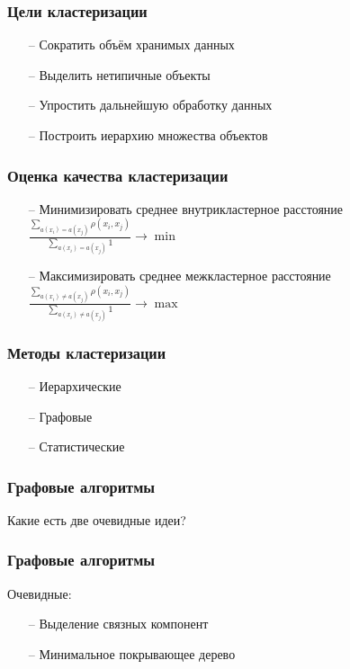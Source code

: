 \documentclass[12pt]{beamer}
\begin{document}
\begin{frame}\frametitle{Цели кластеризации}
	\begin{itemize}
		\item[--] Сократить объём хранимых данных
		\item[--] Выделить нетипичные объекты
		\item[--] Упростить дальнейшую обработку данных
		\item[--] Построить иерархию множества объектов				
	\end{itemize}
\end{frame}

\begin{frame}\frametitle{Оценка качества кластеризации}
\begin{itemize}
\item[--] Минимизировать среднее внутрикластерное расстояние\\
\vspace{5mm}
${\frac{\sum\limits_{a(x_i) = a(x_j)} \rho(x_i, x_j)}{\sum\limits_{a(x_i) = a(x_j)} 1} \rightarrow \min}$
\item[--] Максимизировать среднее межкластерное расстояние\\
\vspace{5mm}
${\frac{\sum\limits_{a(x_i) \neq a(x_j)} \rho(x_i, x_j)}{\sum\limits_{a(x_i) \neq a(x_j)} 1} \rightarrow \max}$
\end{itemize}
\end{frame}

\begin{frame}\frametitle{Методы кластеризации}
\begin{itemize}
\item[--] Иерархические
\item[--] Графовые 
\item[--] Статистические 
\end{itemize}
\end{frame}

\begin{frame}\frametitle{Графовые алгоритмы}
Какие есть две очевидные идеи?
\end{frame}

\begin{frame}\frametitle{Графовые алгоритмы}
Очевидные:\\
\begin{itemize}
\item[--] Выделение связных компонент
\item[--] Минимальное покрывающее дерево
\end{itemize}
\end{frame}
\end{document}
